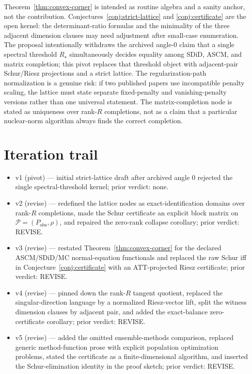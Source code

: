\documentclass[11pt]{article}
\theoremstyle{definition}
\theoremstyle{plain}
\theoremstyle{remark}
\begin{document}
Theorem~\ref{thm:convex-corner} is intended as routine algebra and a sanity anchor, not the contribution. Conjectures~\ref{conj:strict-lattice} and \ref{conj:certificate} are the open kernel: the determinant-ratio formulas and the minimality of the three adjacent dimension clauses may need adjustment after small-case enumeration. The proposal intentionally withdraws the archived angle-0 claim that a single spectral threshold \(R_\star\) simultaneously decides equality among SDiD, ASCM, and matrix completion; this pivot replaces that threshold object with adjacent-pair Schur/Riesz projections and a strict lattice. The regularization-path normalization is a genuine risk: if two published papers use incompatible penalty scaling, the lattice must state separate fixed-penalty and vanishing-penalty versions rather than one universal statement. The matrix-completion node is stated as uniqueness over rank-\(R\) completions, not as a claim that a particular nuclear-norm algorithm always finds the correct completion.

\section{Iteration trail}

\begin{itemize}[leftmargin=*]
\item v1 (pivot) --- initial strict-lattice draft after archived angle 0 rejected the single spectral-threshold kernel; prior verdict: none.
\item v2 (revise) --- redefined the lattice nodes as exact-identification domains over rank-\(R\) completions, made the Schur certificate an explicit block matrix on \(\mathcal P=(P_{\mathrm{obs}},\rho)\), and repaired the zero-rank collapse corollary; prior verdict: REVISE.
\item v3 (revise) --- restated Theorem~\ref{thm:convex-corner} for the declared ASCM/SDiD/MC normal-equation functionals and replaced the raw Schur iff in Conjecture~\ref{conj:certificate} with an ATT-projected Riesz certificate; prior verdict: REVISE.
\item v4 (revise) --- pinned down the rank-\(R\) tangent quotient, replaced the singular-direction language by a normalized Riesz-vector lift, split the witness dimension clauses by adjacent pair, and added the exact-balance zero-certificate corollary; prior verdict: REVISE.
\item v5 (revise) --- added the omitted ensemble-methods comparison, replaced generic method-function prose with explicit population optimization problems, stated the certificate as a finite-dimensional algorithm, and inserted the Schur-elimination identity in the proof sketch; prior verdict: REVISE.
\end{itemize}
\end{document}
